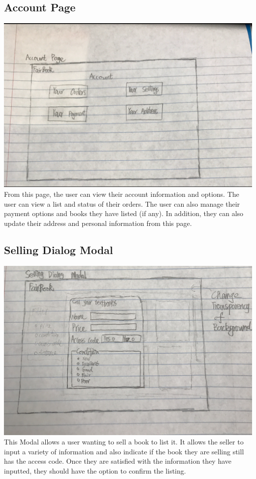\documentclass[12pt]{article}
\begin{document}
		\subsection{Account Page}
		\includegraphics[width=14cm]{account_page.eps}
			From this page, the user can view their account information and options. 
			The user can view a list and status of their orders. 
			The user can also manage their payment options and books they have listed (if any). 
			In addition, they can also update their address and personal information from this page.

		\subsection{Selling Dialog Modal}
		\includegraphics[width=14cm]{selling_dialog_modal.eps}
			This Modal allows a user wanting to sell a book to list it. 
			It allows the seller to input a variety of information and also indicate if the book they are selling still has the access code. 
			Once they are satisfied with the information they have inputted, they should have the option to confirm the listing.
\end{document}
